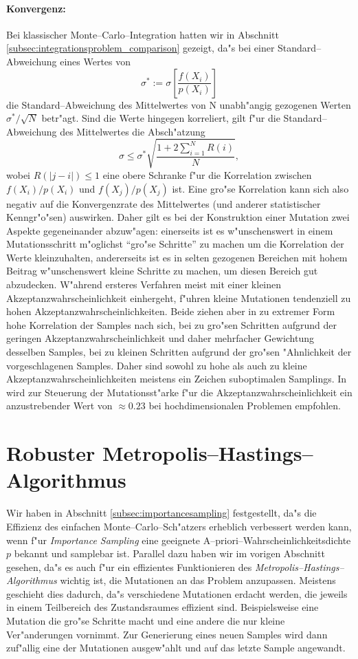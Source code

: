 	\paragraph{Konvergenz:}Bei klassischer Monte--Carlo--Integration hatten wir in Abschnitt \ref{subsec:integrationsproblem_comparison} gezeigt, da"s bei einer Standard--Abweichung eines Wertes von $$\sigma^*:=\sigma\left[\frac{f(X_i)}{p(X_i)}\right]$$ die Standard--Abweichung des Mittelwertes von N unabh"angig gezogenen Werten $\sigma^*/\sqrt{N}$ betr"agt. Sind die Werte hingegen korreliert, gilt f"ur die Standard--Abweichung des Mittelwertes die Absch"atzung \citep[siehe][VII.\;\S3(8)]{Renyi:1964p10655}
	$$\sigma\leq \sigma^*\sqrt{\frac{1+2\sum_{i=1}^N R(i)}{N}},$$
	wobei $R(|j-i|)\leq 1$ eine obere Schranke f"ur die Korrelation zwischen $f(X_i)/p(X_i)$ und $f(X_j)/p(X_j)$ ist.
	Eine gro"se Korrelation kann sich also negativ auf die Konvergenzrate des Mittelwertes (und anderer statistischer Kenngr"o"sen) auswirken. Daher gilt es bei der Konstruktion einer Mutation zwei Aspekte gegeneinander abzuw"agen: einerseits ist es w"unschenswert in einem Mutationsschritt m"oglichst ``gro"se Schritte'' zu machen um die Korrelation der Werte kleinzuhalten, andererseits ist es in selten gezogenen Bereichen mit hohem Beitrag w"unschenswert kleine Schritte zu machen, um diesen Bereich gut abzudecken. W"ahrend ersteres Verfahren meist mit einer kleinen Akzeptanzwahrscheinlichkeit einhergeht, f"uhren kleine Mutationen tendenziell zu hohen Akzeptanzwahrscheinlichkeiten. Beide ziehen aber in zu extremer Form hohe Korrelation der Samples nach sich, bei zu gro"sen Schritten aufgrund der geringen Akzeptanzwahrscheinlichkeit und daher mehrfacher Gewichtung desselben Samples, bei zu kleinen Schritten aufgrund der gro"sen "Ahnlichkeit der vorgeschlagenen Samples. Daher sind sowohl zu hohe als auch zu kleine Akzeptanzwahrscheinlichkeiten meistens ein Zeichen suboptimalen Samplings. In \citep{Roberts:1997p5198} wird zur Steuerung der Mutationsst"arke f"ur die Akzeptanzwahrscheinlichkeit ein anzustrebender Wert von $\approx 0.23$ bei hochdimensionalen Problemen empfohlen.

	
	
	\section{Robuster Metropolis--Hastings--Algorithmus}
	Wir haben in Abschnitt \ref{subsec:importancesampling} festgestellt, da"s die Effizienz des einfachen Monte--Carlo--Sch"atzers erheblich verbessert werden kann, wenn f"ur {\em Importance Sampling} eine geeignete A--priori--Wahrscheinlichkeitsdichte $p$ bekannt und samplebar ist. Parallel dazu haben wir im vorigen Abschnitt gesehen, da"s es auch f"ur ein effizientes Funktionieren des {\em Metropolis--Hastings--Algorithmus} wichtig ist, die Mutationen an das Problem anzupassen. Meistens geschieht dies dadurch, da"s verschiedene Mutationen erdacht werden, die jeweils in einem Teilbereich des Zustandsraumes effizient sind. Beispielsweise eine Mutation die gro"se Schritte macht und eine andere die nur kleine Ver"anderungen vornimmt. Zur Generierung eines neuen Samples wird dann zuf"allig eine der Mutationen ausgew"ahlt und auf das letzte Sample angewandt.
	
